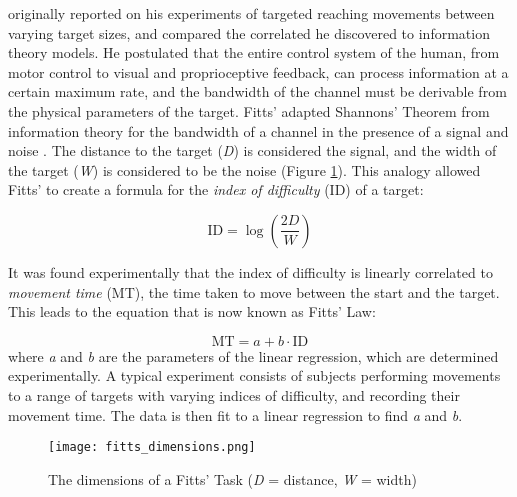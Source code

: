 \citet{fitts_information_1954} originally reported on his experiments of targeted reaching movements between varying target sizes, and compared the correlated he discovered to information theory models.
He postulated that the entire control system of the human, from motor control to visual and proprioceptive feedback, can process information at a certain maximum rate, and the bandwidth of the channel must be derivable from the physical parameters of the target.
Fitts' adapted Shannons' Theorem from information theory for the bandwidth of a channel in the presence of a signal and noise \citep{shannon_communication_1949}.
The distance to the target (\emph{D}) is considered the signal, and the width of the target (\emph{W}) is considered to be the noise (Figure \ref{fig:intro_fitts}).
This analogy allowed Fitts' to create a formula for the \emph{index of difficulty} (\(\text{ID}\)) of a target:

\begin{equation}
    \mathrm{ID} = \log\left(\frac{2D}{W}\right)
    \label{eq:intro_id}
\end{equation}

It was found experimentally that the index of difficulty is linearly correlated to \emph{movement time} (MT), the time taken to move between the start and the target.
This leads to the equation that is now known as Fitts' Law:

\begin{equation}
    \mathrm{MT} = a + b \cdot \mathrm{ID}
\end{equation}
where \emph{a} and \emph{b} are the parameters of the linear regression, which are determined experimentally.
A typical experiment consists of subjects performing movements to a range of targets with varying indices of difficulty, and recording their movement time.
The data is then fit to a linear regression to find \emph{a} and \emph{b}.

\begin{figure}
    \centering
    \texttt{[image: fitts\_dimensions.png]}
    \caption{The dimensions of a Fitts' Task (\emph{D} = distance, \emph{W} = width)}
    \label{fig:intro_fitts}
\end{figure}

